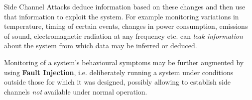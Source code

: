Side Channel Attacks deduce information based on these changes and then use that
information to exploit the system. 
For example monitoring variations in temperature,
timing of certain events, changes in power consumption, emissions of sound,
electromagnetic radiation at any frequency etc. can \textit{leak information} about the system
from which data may be inferred or deduced.

Monitoring of a system’s behavioural symptoms may be further augmented by using \textbf{Fault
Injection}, i.e. deliberately running a system under conditions outside those for which it was
designed, possibly allowing to establish side channels \textit{not} available under normal operation.